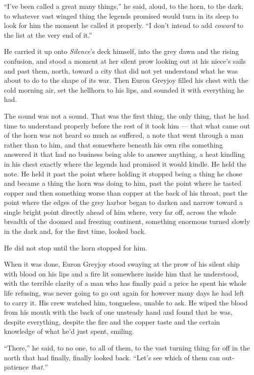 “I’ve been called a great many things,” he said, aloud, to the horn, to the dark, to whatever vast winged thing the legends promised would turn in its sleep to look for him the moment he called it properly. “I don’t intend to add \textit{coward} to the list at the very end of it.”

He carried it up onto \textit{Silence}’s deck himself, into the grey dawn and the rising confusion, and stood a moment at her silent prow looking out at his niece’s sails and past them, north, toward a city that did not yet understand what he was about to do to the shape of its war. Then Euron Greyjoy filled his chest with the cold morning air, set the hellhorn to his lips, and sounded it with everything he had.

The sound was not a sound. That was the first thing, the only thing, that he had time to understand properly before the rest of it took him — that what came out of the horn was not heard so much as suffered, a note that went through a man rather than to him, and that somewhere beneath his own ribs something answered it that had no business being able to answer anything, a heat kindling in his chest exactly where the legends had promised it would kindle. He held the note. He held it past the point where holding it stopped being a thing he chose and became a thing the horn was doing to him, past the point where he tasted copper and then something worse than copper at the back of his throat, past the point where the edges of the grey harbor began to darken and narrow toward a single bright point directly ahead of him where, very far off, across the whole breadth of the doomed and freezing continent, something enormous turned slowly in the dark and, for the first time, looked back.

He did not stop until the horn stopped for him.

When it was done, Euron Greyjoy stood swaying at the prow of his silent ship with blood on his lips and a fire lit somewhere inside him that he understood, with the terrible clarity of a man who has finally paid a price he spent his whole life refusing, was never going to go out again for however many days he had left to carry it. His crew watched him, tongueless, unable to ask. He wiped the blood from his mouth with the back of one unsteady hand and found that he was, despite everything, despite the fire and the copper taste and the certain knowledge of what he’d just spent, smiling.

“There,” he said, to no one, to all of them, to the vast turning thing far off in the north that had finally, finally looked back. “Let’s see which of them can out-patience \textit{that.}”